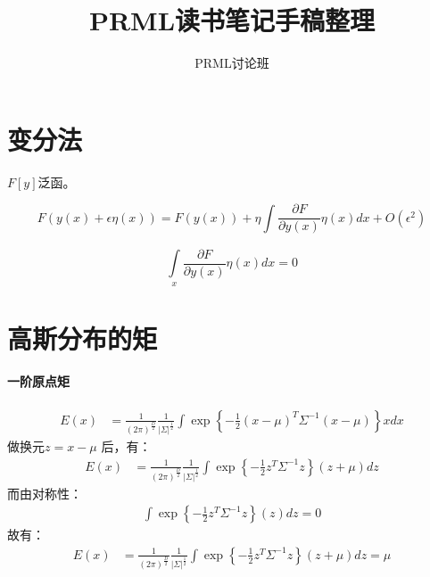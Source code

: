 \documentclass[cn,black,12pt,normal]{elegantnote}
\title{PRML读书笔记手稿整理}
\author{PRML讨论班}
\institute{Tongji University}
\date{\zhtoday}
\begin{document}

\section{变分法}

$F[y]$泛函。


\begin{equation*}
    F(y(x)+\epsilon \eta(x) ) = F(y(x)) + \eta \int \frac{\partial F}{\partial y(x)}\eta(x) dx + O(\epsilon^2)
\end{equation*}

\begin{equation*}
    \int\limits_{x}^{}  \frac{\partial F}{\partial y(x)}\eta(x) dx = 0
\end{equation*}

\section{高斯分布的矩}

\paragraph{一阶原点矩} 

\begin{align*}
E(x) & = \frac{1}{(2\pi )^{\frac{D }{2} }} \frac{1}{\left | \Sigma  \right |^{\frac{1}{2} }  }\int 
\exp\left \{ -\frac{1}{2} (x-\mu )^T\Sigma^{-1}(x-\mu) \right \}x dx  
\end{align*}
做换元$z = x - \mu$ 后，有：
\begin{align*}
E(x) & = \frac{1}{(2\pi )^{\frac{D }{2} }} \frac{1}{\left | \Sigma  \right |^{\frac{1}{2} }  }\int 
\exp\left \{ -\frac{1}{2} z^T\Sigma^{-1}z \right \}(z+\mu) dz  
\end{align*}
而由对称性：
\begin{align*}
\int \exp\left \{ -\frac{1}{2} z^T\Sigma^{-1}z \right \}(z) dz = 0
\end{align*}
故有：
\begin{align*}
E(x) & = \frac{1}{(2\pi )^{\frac{D }{2} }} \frac{1}{\left | \Sigma  \right |^{\frac{1}{2} }  }\int 
\exp\left \{ -\frac{1}{2} z^T\Sigma^{-1}z \right \}(z+\mu) dz = \mu
\end{align*}
\end{document}
